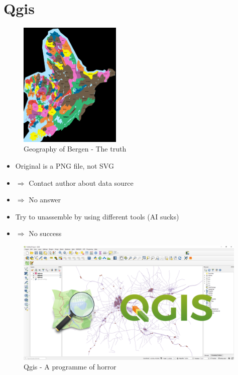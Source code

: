 \section{Qgis}
\begin{frame}
    \begin{figure}
        \centering
        \includegraphics[height = 6cm]{images/boligomraaderWiki.png}%
        \caption{Geography of Bergen - The truth}
    \end{figure}
\end{frame}

\begin{frame}
    \begin{itemize}[<+->]
        \item Original is a PNG file, not SVG
        \item $\Rightarrow$ Contact author about data source
        \item $\Rightarrow$ No answer
        \item Try to unassemble by using different tools (AI sucks)
        \item $\Rightarrow$ No success
    \end{itemize}
\end{frame}

\begin{frame}
    \begin{figure}
        \centering
        \includegraphics[height = 6cm]{images/qgis.png}%
        \caption{Qgis - A programme of horror}
    \end{figure}
\end{frame}

